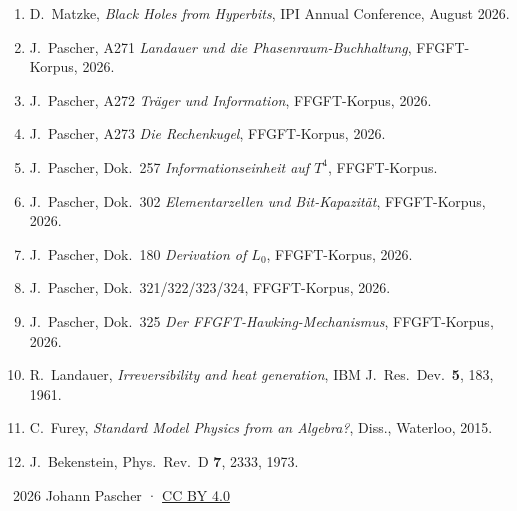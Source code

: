 \begin{enumerate}
  \item D.\ Matzke, \textit{Black Holes from Hyperbits}, IPI Annual Conference, August 2026.
  \item J.\ Pascher, A271 \textit{Landauer und die Phasenraum-Buchhaltung}, FFGFT-Korpus, 2026.
  \item J.\ Pascher, A272 \textit{Träger und Information}, FFGFT-Korpus, 2026.
  \item J.\ Pascher, A273 \textit{Die Rechenkugel}, FFGFT-Korpus, 2026.
  \item J.\ Pascher, Dok.\ 257 \textit{Informationseinheit auf $T^4$}, FFGFT-Korpus.
  \item J.\ Pascher, Dok.\ 302 \textit{Elementarzellen und Bit-Kapazität}, FFGFT-Korpus, 2026.
  \item J.\ Pascher, Dok.\ 180 \textit{Derivation of $L_0$}, FFGFT-Korpus, 2026.
  \item J.\ Pascher, Dok.\ 321/322/323/324, FFGFT-Korpus, 2026.
  \item J.\ Pascher, Dok.\ 325 \textit{Der FFGFT-Hawking-Mechanismus}, FFGFT-Korpus, 2026.
  \item R.\ Landauer, \textit{Irreversibility and heat generation}, IBM J.\ Res.\ Dev.\ \textbf{5}, 183, 1961.
  \item C.\ Furey, \textit{Standard Model Physics from an Algebra?}, Diss., Waterloo, 2015.
  \item J.\ Bekenstein, Phys.\ Rev.\ D \textbf{7}, 2333, 1973.
\end{enumerate}

\vspace{6pt}\noindent\small
\textcopyright\ 2026 Johann Pascher · \href{https://creativecommons.org/licenses/by/4.0/}{CC BY 4.0}

